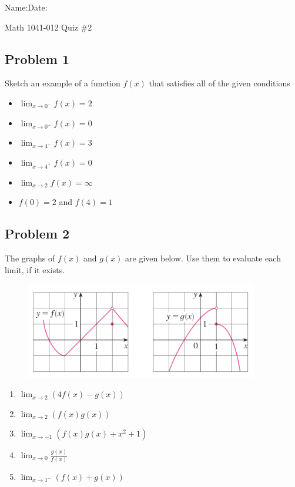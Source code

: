 \documentclass[10pt]{book}
\theoremstyle{definition}
\begin{document}
\begin{flushleft}
Name:\underline{\hspace{13cm}}Date:\underline{\hspace{2cm}}
\end{flushleft}
\begin{center}
{\Large Math 1041-012 \hspace{0.5cm} Quiz \#2}
\end{center}
\vspace{0.2 cm}
\subsection*{Problem 1} Sketch an example of a function $f(x)$ that satisfies all of the given conditions
\begin{itemize}
    \item $\displaystyle\lim_{x\rightarrow 0^-}f(x)=2$
    \item $\displaystyle\lim_{x\rightarrow 0^+}f(x)=0$
    \item $\displaystyle\lim_{x\rightarrow 4^-}f(x)=3$
    \item $\displaystyle\lim_{x\rightarrow 4^+}f(x)=0$
    \item $\displaystyle \lim_{x\rightarrow 2}f(x)=\infty$
    \item $f(0)=2$ and $f(4)=1$
\end{itemize}
\subsection*{Problem 2} The graphs of $f(x)$ and $g(x)$ are given below. Use them to evaluate each limit, if it exists.
\begin{figure}[h]
    \centering
    \includegraphics[width=4in]{fandg.png}
\end{figure}
\begin{enumerate}[label=(\alph*)]
    \item $\displaystyle \lim_{x\rightarrow 2}\left(4f(x)-g(x)\right)$ \vspace{1cm}
    \item $\displaystyle \lim_{x\rightarrow 2}\left(f(x)g(x)\right)$\vspace{1cm}
    \item $\displaystyle \lim_{x\rightarrow -1}\left(f(x)g(x)+x^2+1\right)$\vspace{1cm}
    \item $\displaystyle \lim_{x\rightarrow 0}\frac{g(x)}{f(x)}$\vspace{1cm}
    \item $\displaystyle \lim_{x\rightarrow 1^-}\left(f(x)+g(x)\right)$
\end{enumerate}
\pagebreak
\end{document}
